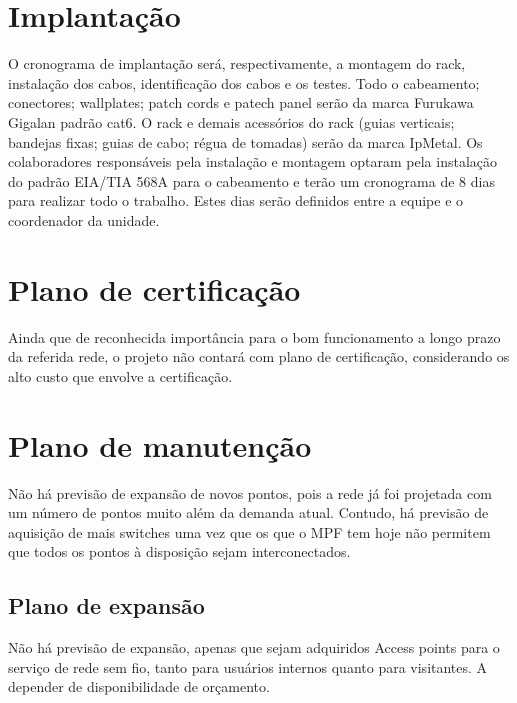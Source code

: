 \documentclass[	DIV=calc,%
							paper=a4,%
							fontsize=12pt,%
							onecolumn]{scrartcl}	 					%
\begin{document}
\section{Implantação}
O cronograma de implantação será, respectivamente, a montagem do rack, instalação dos cabos, identificação dos cabos e os testes.
Todo o cabeamento; conectores; wallplates; patch cords e patech panel serão da marca Furukawa Gigalan padrão cat6. O rack e demais acessórios do rack (guias verticais; bandejas fixas; guias de cabo; régua de tomadas) serão da marca IpMetal. Os colaboradores responsáveis pela instalação e montagem optaram pela instalação do padrão EIA/TIA 568A para o cabeamento e terão um cronograma de 8 dias para realizar todo o trabalho. Estes dias serão definidos entre a equipe e o coordenador da unidade.

\section{Plano de certificação}
Ainda que de reconhecida importância para o bom funcionamento a longo prazo da referida rede, o projeto não contará com plano de certificação, considerando os alto custo que envolve a certificação. 

\section{Plano de manutenção}
Não há previsão de expansão de novos pontos, pois a rede já foi projetada com um número de pontos muito além da demanda atual. Contudo, há previsão de aquisição de mais switches uma vez que os que o MPF tem hoje não permitem que todos os pontos à disposição sejam interconectados.

\subsection{Plano de expansão}

Não há previsão de expansão, apenas que sejam adquiridos Access points para o serviço de rede sem fio, tanto para usuários internos quanto para visitantes. A depender de disponibilidade de orçamento.


\end{document}
